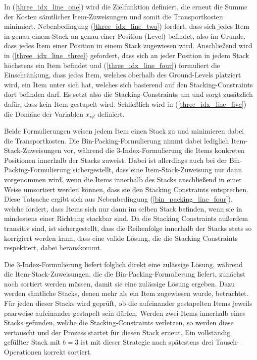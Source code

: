 In (\ref{three_idx_line_one}) wird die Zielfunktion definiert, die erneut die Summe der Kosten sämtlicher Item-Zuweisungen
und somit die Transportkosten minimiert.
Nebenbedingung (\ref{three_idx_line_two}) fordert, dass sich jedes Item in genau einem Stack an genau einer Position (Level) befindet,
also im Grunde, dass jedes Item einer Position in einem Stack zugewiesen wird.
Anschließend wird in (\ref{three_idx_line_three}) gefordert, dass sich an jeder Position in jedem Stack höchstens ein Item befindet und
(\ref{three_idx_line_four}) formuliert die Einschränkung, dass jedes Item, welches oberhalb des Ground-Levels platziert wird,
ein Item unter sich hat, welches sich basierend auf den Stacking-Constraints dort befinden darf.
Es setzt also die Stacking-Constraints um und sorgt zusätzlich dafür, dass kein Item  gestapelt wird.
Schließlich wird in (\ref{three_idx_line_five}) die Domäne der Variablen $x_{iql}$ definiert.

Beide Formulierungen weisen jedem Item einen Stack zu und minimieren dabei die Transportkosten.
Die Bin-Packing-Formulierung nimmt dabei lediglich Item-Stack-Zuweisungen vor, während die 3-Index-Formulierung die
Items konkreten Positionen innerhalb der Stacks zuweist. Dabei ist allerdings auch bei der Bin-Packing-Formulierung
sichergestellt, dass eine Item-Stack-Zuweisung nur dann vorgenommen wird, wenn die Items innerhalb des Stacks anschließend
in einer Weise umsortiert werden können, dass sie den Stacking Constraints entsprechen. Diese Tatsache ergibt sich aus Nebenbedingung (\ref{bin_packing_line_four}), welche fordert, dass Items sich nur dann im selben Stack befinden, wenn sie in mindestens einer Richtung stackbar sind.
Da die Stacking Constraints außerdem transitiv sind, ist sichergestellt, dass die Reihenfolge innerhalb der Stacks stets so korrigiert werden kann, dass eine valide Lösung, die die Stacking Constraints respektiert, dabei herauskommt.

Die 3-Index-Formulierung liefert folglich direkt eine zulässige Lösung, während die Item-Stack-Zuweisungen, die die Bin-Packing-Formulierung liefert, zunächst noch sortiert werden müssen, damit sie eine zulässige Lösung ergeben.
Dazu werden sämtliche Stacks, denen mehr als ein Item zugewiesen wurde, betrachtet. Für jeden
dieser Stacks wird geprüft, ob die aufeinander gestapelten Items jeweils paarweise aufeinander gestapelt sein dürfen.
Werden zwei Items innerhalb eines Stacks gefunden, welche die Stacking-Constraints verletzen, so werden diese
vertauscht und der Prozess startet für diesen Stack erneut. Ein vollständig gefüllter Stack mit $b = 3$ ist mit dieser
Strategie nach spätestens drei Tausch-Operationen korrekt sortiert.

